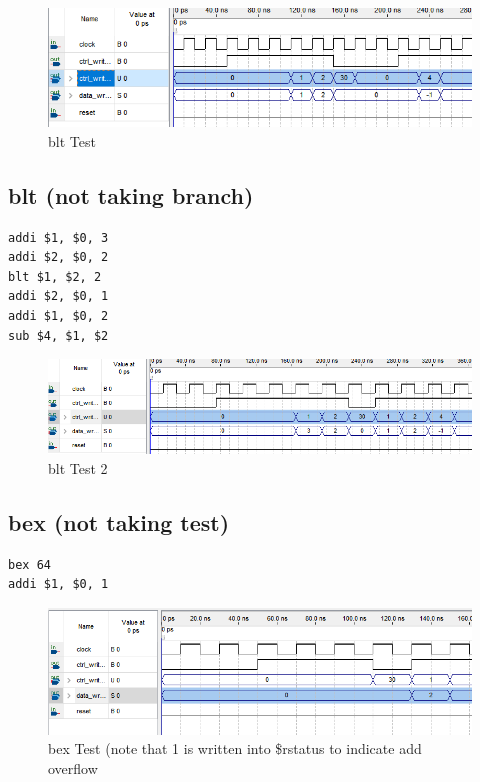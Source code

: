 \documentclass[letterpaper]{article} %
\begin{document}
   \FloatBarrier
      \begin{figure}[!htb]
        \includegraphics[scale=.9]{bltTest.PNG}
        \caption{blt Test}
        \label{fig:2}
    \end{figure}
    
       \FloatBarrier
    
    
\subsection{blt (not taking branch)}
\begin{verbatim}
addi $1, $0, 3
addi $2, $0, 2
blt $1, $2, 2
addi $2, $0, 1
addi $1, $0, 2
sub $4, $1, $2 

\end{verbatim}
   \FloatBarrier
  \begin{figure}[!htb]
        \includegraphics[scale=.7]{bltTest2.PNG}
        \caption{blt Test 2}
        \label{fig:2}
    \end{figure}
       \FloatBarrier
    
    
\subsection{bex (not taking test)}
\begin{verbatim}
bex 64
addi $1, $0, 1

\end{verbatim}
   \FloatBarrier
  \begin{figure}[!htb]
        \includegraphics[scale=.5]{bexTest.PNG}
        \caption{bex Test (note that 1 is written into \$rstatus to indicate add overflow}
        \label{fig:2}
    \end{figure}
       \FloatBarrier
    
\end{document}
